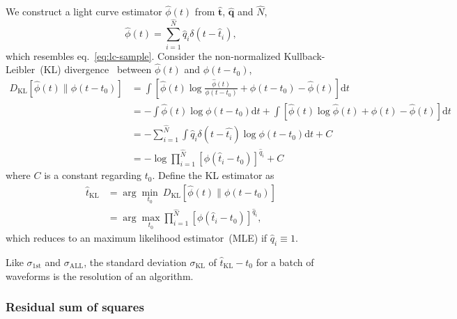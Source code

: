 We construct a light curve estimator $\hat{\phi}(t)$ from $\bm{\hat{t}}$, $\bm{\hat{q}}$ and $\hat{N}$,
\begin{equation}
  \label{eq:lc}
  \hat{\phi}(t) = \sum_{i=1}^{\hat{N}} \hat{q}_i\delta(t-\hat{t}_i),
\end{equation}
which resembles eq.~\eqref{eq:lc-sample}.
Consider the non-normalized Kullback-Leibler~(KL) divergence~\cite{mihoko_robust_2002} between $\hat{\phi}(t)$ and $\phi(t-t_{0})$,
\begin{equation}
  \begin{aligned}
    D_\mathrm{KL}\left[\hat{\phi}(t) \parallel \phi(t-t_0)\right] & =\int \left[\hat{\phi}(t) \log\frac{\hat{\phi}(t)}{\phi(t-t_0)} + \phi(t-t_0) - \hat{\phi}(t) \right]\mathrm{d}t \\
    & = - \int \hat{\phi}(t) \log\phi(t-t_0)\mathrm{d}t + \int \left[\hat{\phi}(t) \log\hat{\phi}(t) + \phi(t) - \hat{\phi}(t) \right]\mathrm{d}t \\
    & = - \sum_{i=1}^{\hat{N}}\int \hat{q}_i\delta(t-\hat{t_i}) \log\phi(t-t_0)\mathrm{d}t + C \\
    & = -\log \prod_{i=1}^{\hat{N}} \left[\phi(\hat{t}_i-t_0)\right]^{\hat{q}_i} + C
  \label{eq:kl}
  \end{aligned}
\end{equation}
where $C$ is a constant regarding $t_0$.  Define the KL estimator as
\begin{equation}
  \begin{aligned}
  \label{eq:pseudo}
  \hat{t}_\mathrm{KL} &= \arg\underset{t_0}{\min}~D_\mathrm{KL}\left[\hat{\phi}(t) \parallel \phi(t-t_0)\right] \\
  &= \arg\underset{t_0}{\max} \prod_{i=1}^{\hat{N}} \left[\phi(\hat{t}_i-t_0)\right]^{\hat{q}_i},
  \end{aligned}
\end{equation}
which reduces to an maximum likelihood estimator~(MLE) if $\hat{q}_i\equiv 1$.

Like $\sigma_\mathrm{1st}$ and $\sigma_\mathrm{ALL}$, the standard deviation $\sigma_\mathrm{KL}$ of $\hat{t}_\mathrm{KL} - t_0$ for a batch of waveforms is the resolution of an algorithm.


\subsubsection{Residual sum of squares}
\label{sec:rss}

